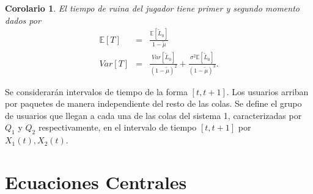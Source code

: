 \documentclass{article}
\newtheorem{Coro}{Corolario}[section]
\newcommand{\esp}{\mathbb{E}}
\numberwithin{equation}{section}
\begin{document}
\begin{Coro}
El tiempo de ruina del jugador tiene primer y segundo momento dados por
\begin{eqnarray}
\esp\left[T\right]&=&\frac{\esp\left[\tilde{L}_{0}\right]}{1-\tilde{\mu}}\\
Var\left[T\right]&=&\frac{Var\left[\tilde{L}_{0}\right]}{\left(1-\tilde{\mu}\right)^{2}}+\frac{\sigma^{2}\esp\left[\tilde{L}_{0}\right]}{\left(1-\tilde{\mu}\right)^{3}}.
\end{eqnarray}
\end{Coro}

Se considerar\'an intervalos de tiempo de la forma
$\left[t,t+1\right]$. Los usuarios arriban por paquetes de manera
independiente del resto de las colas. Se define el grupo de
usuarios que llegan a cada una de las colas del sistema 1,
caracterizadas por $Q_{1}$ y $Q_{2}$ respectivamente, en el
intervalo de tiempo $\left[t,t+1\right]$ por
$X_{1}\left(t\right),X_{2}\left(t\right)$.


\section{Ecuaciones Centrales}
\end{document}
